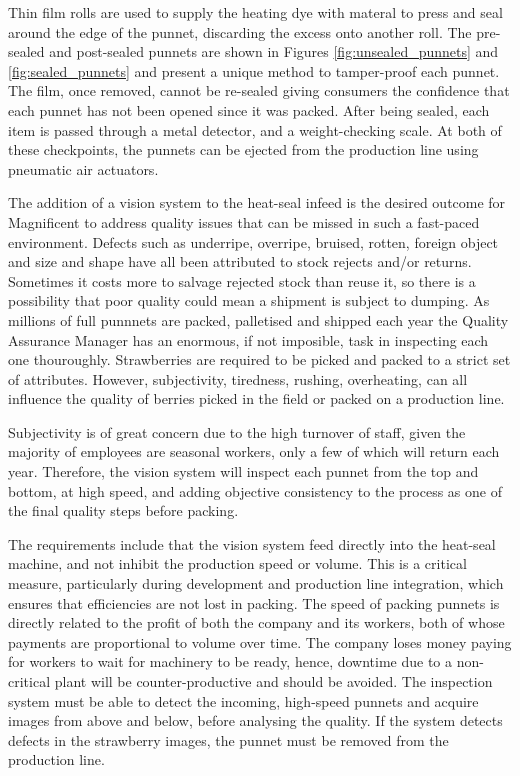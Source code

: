 \documentclass[fleqn,twoside]{article}
\begin{document}
Thin film rolls are used to supply the heating dye with materal to press and seal around the edge of the punnet, discarding the excess onto another roll. The pre-sealed and post-sealed punnets are shown in Figures \ref{fig:unsealed_punnets} and \ref{fig:sealed_punnets} and present a unique method to tamper-proof each punnet. The film, once removed, cannot be re-sealed giving consumers the confidence that each punnet has not been opened since it was packed. After being sealed, each item is passed through a metal detector, and a weight-checking scale. At both of these checkpoints, the punnets can be ejected from the production line using pneumatic air actuators.

The addition of a vision system to the heat-seal infeed is the desired outcome for Magnificent to address quality issues that can be missed in such a fast-paced environment. Defects such as underripe, overripe, bruised, rotten, foreign object and size and shape have all been attributed to stock rejects and/or returns. Sometimes it costs more to salvage rejected stock than reuse it, so there is a possibility that poor quality could mean a shipment is subject to dumping. As millions of full punnnets are packed, palletised and shipped each year the Quality Assurance Manager has an enormous, if not imposible, task in inspecting each one thouroughly. Strawberries are required to be picked and packed to a strict set of attributes. However, subjectivity, tiredness, rushing, overheating, can all influence the quality of berries picked in the field or packed on a production line. 

Subjectivity is of great concern due to the high turnover of staff, given the majority of employees are seasonal workers, only a few of which will return each year. Therefore, the vision system will inspect each punnet from the top and bottom, at high speed, and adding objective consistency to the process as one of the final quality steps before packing.


The requirements include that the vision system feed directly into the heat-seal machine, and not inhibit the production speed or volume. This is a critical measure, particularly during development and production line integration, which ensures that efficiencies are not lost in packing. The speed of packing punnets is directly related to the profit of both the company and its workers, both of whose payments are proportional to volume over time. The company loses money paying for workers to wait for machinery to be ready, hence, downtime due to a non-critical plant will be counter-productive and should be avoided. The inspection system must be able to detect the incoming, high-speed punnets and acquire images from above and below, before analysing the quality. If the system detects defects in the strawberry images, the punnet must be removed from the production line. 
\end{document}
